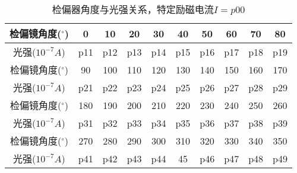     \begin{table}[H]
      \centering
      \begin{tabular}{|c|c|c|c|c|c|c|c|c|c|}
        \hline
        检偏镜角度(${}^{\circ}$) & 0 & 10 & 20 & 30 & 40 & 50 & 60 & 70 & 80 \\\hline
        光强($10^{-7} \si{A}$)  & p11 & p12 & p13 & p14 & p15 & p16 & p17 & p18 & p19 \\\hline
        检偏镜角度(${}^{\circ}$) & 90 & 100 & 110 & 120 & 130 & 140 & 150 & 160 & 170 \\\hline
        光强($10^{-7} \si{A}$)  & p21 & p22 & p23 & p24 & p25 & p26 & p27 & p28 & p29 \\\hline
        检偏镜角度(${}^{\circ}$) & 180 & 190 & 200 & 210 & 220 & 230 & 240 & 250 & 260  \\\hline
        光强($10^{-7} \si{A}$)  & p31 & p32 & p33 & p34 & p35 & p36 & p37 & p38 & p39 \\\hline
        检偏镜角度(${}^{\circ}$) & 270 & 280 & 290 & 300 & 310 & 320 & 330 & 340 & 350 \\\hline
        光强($10^{-7} \si{A}$)  & p41 & p42 & p43 & p44 & 45 & p46 & p47 & p48 & p49 \\\hline
      \end{tabular}
      \caption{检偏器角度与光强关系，特定励磁电流$I=p00$}
    \end{table}
